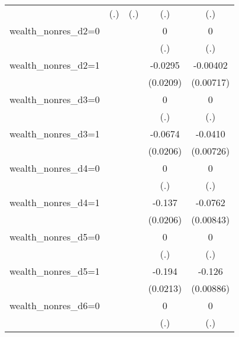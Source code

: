 \begin{table}[htbp]
\begin{tabular}{l*{4}{c}}
                &      (.)         &      (.)         &      (.)         &      (.)         \\
\addlinespace
wealth\_nonres\_d2=0&                  &                  &        0         &        0         \\
                &                  &                  &      (.)         &      (.)         \\
\addlinespace
wealth\_nonres\_d2=1&                  &                  &  -0.0295         & -0.00402         \\
                &                  &                  & (0.0209)         &(0.00717)         \\
\addlinespace
wealth\_nonres\_d3=0&                  &                  &        0         &        0         \\
                &                  &                  &      (.)         &      (.)         \\
\addlinespace
wealth\_nonres\_d3=1&                  &                  &  -0.0674\sym{***}&  -0.0410\sym{***}\\
                &                  &                  & (0.0206)         &(0.00726)         \\
\addlinespace
wealth\_nonres\_d4=0&                  &                  &        0         &        0         \\
                &                  &                  &      (.)         &      (.)         \\
\addlinespace
wealth\_nonres\_d4=1&                  &                  &   -0.137\sym{***}&  -0.0762\sym{***}\\
                &                  &                  & (0.0206)         &(0.00843)         \\
\addlinespace
wealth\_nonres\_d5=0&                  &                  &        0         &        0         \\
                &                  &                  &      (.)         &      (.)         \\
\addlinespace
wealth\_nonres\_d5=1&                  &                  &   -0.194\sym{***}&   -0.126\sym{***}\\
                &                  &                  & (0.0213)         &(0.00886)         \\
\addlinespace
wealth\_nonres\_d6=0&                  &                  &        0         &        0         \\
                &                  &                  &      (.)         &      (.)         \\

\end{tabular}
\end{table}

